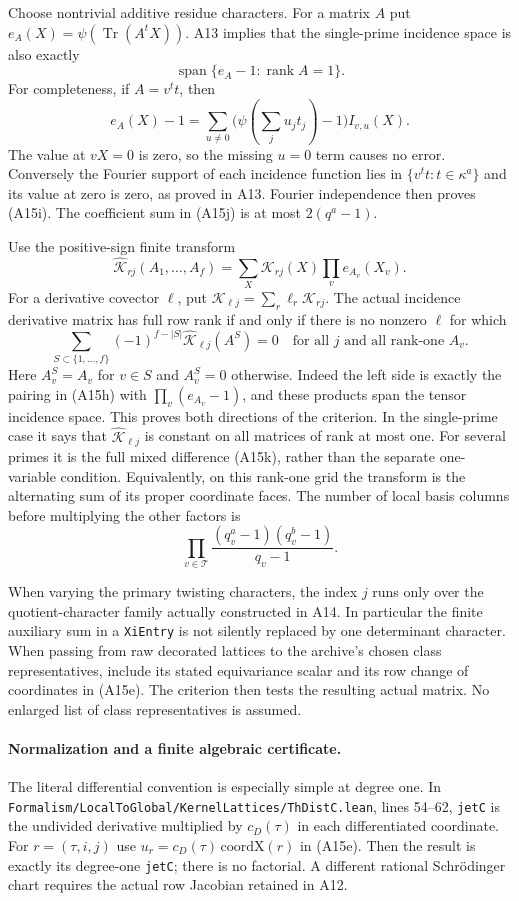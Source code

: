 Choose nontrivial additive residue characters.  For a matrix $A$
put $e_A(X)=\psi(\operatorname{Tr}(A^tX))$.  A13 implies that the
single-prime incidence space is also exactly
\[
 \operatorname{span}\{e_A-1:\operatorname{rank}A=1\}.
 \tag{A15i}
\]
For completeness, if $A=v^tt$, then
\[
 e_A(X)-1
       =\sum_{u\ne0}\bigl(\psi(\textstyle\sum_j u_jt_j)-1\bigr)I_{v,u}(X).
 \tag{A15j}
\]
The value at $vX=0$ is zero, so the missing $u=0$ term causes no
error.  Conversely the Fourier support of each incidence function
lies in $\{v^tt:t\in\kappa^a\}$ and its value at zero is zero,
as proved in A13.  Fourier independence then proves (A15i).
The coefficient sum in (A15j) is at most $2(q^a-1)$.

Use the positive-sign finite transform
\[
 \widehat{\mathcal K}_{rj}(A_1,\ldots,A_f)
   =\sum_X\mathcal K_{rj}(X)\prod_v e_{A_v}(X_v).
\]
For a derivative covector $\ell$, put
$\mathcal K_{\ell j}=\sum_r\ell_r\mathcal K_{rj}$.
The actual incidence derivative matrix has full row rank if and
only if there is no nonzero $\ell$ for which
\[
 \sum_{S\subset\{1,\ldots,f\}}(-1)^{f-|S|}
       \widehat{\mathcal K}_{\ell j}(A^S)=0
 \quad\text{for all }j\text{ and all rank-one }A_v.
 \tag{A15k}
\]
Here $A^S_v=A_v$ for $v\in S$ and $A^S_v=0$ otherwise.
Indeed the left side is exactly the pairing in (A15h) with
$\prod_v(e_{A_v}-1)$, and these products span the tensor incidence
space.  This proves both directions of the criterion.  In the
single-prime case it says that
$\widehat{\mathcal K}_{\ell j}$ is constant on all matrices of rank
at most one.  For several primes it is the full mixed difference
(A15k), rather than the separate one-variable condition.
Equivalently, on this rank-one grid the transform is the alternating
sum of its proper coordinate faces.  The number of local basis
columns before multiplying the other factors is
\[
       \prod_{v\in\mathcal T}
       \frac{(q_v^a-1)(q_v^b-1)}{q_v-1}.
 \tag{A15l}
\]

When varying the primary twisting characters, the index $j$ runs
only over the quotient-character family actually constructed in
A14.  In particular the finite auxiliary sum in a \texttt{XiEntry}
is not silently replaced by one determinant character.  When passing
from raw decorated lattices to the archive's chosen class
representatives, include its stated equivariance scalar and its row
change of coordinates in (A15e).  The criterion then tests the
resulting actual matrix.  No enlarged list of class representatives
is assumed.

\paragraph{Normalization and a finite algebraic certificate.}
The literal differential convention is especially simple at degree
one.  In
\texttt{Formalism/LocalToGlobal/KernelLattices/ThDistC.lean},
lines 54--62, \texttt{jetC} is the undivided derivative multiplied by
$c_D(\tau)$ in each differentiated coordinate.  For
$r=(\tau,i,j)$ use
$u_r=c_D(\tau)\,\mathrm{coordX}(r)$ in (A15e).
Then the result is exactly its degree-one \texttt{jetC}; there is
no factorial.  A different rational Schr\"odinger chart requires
the actual row Jacobian retained in A12.


